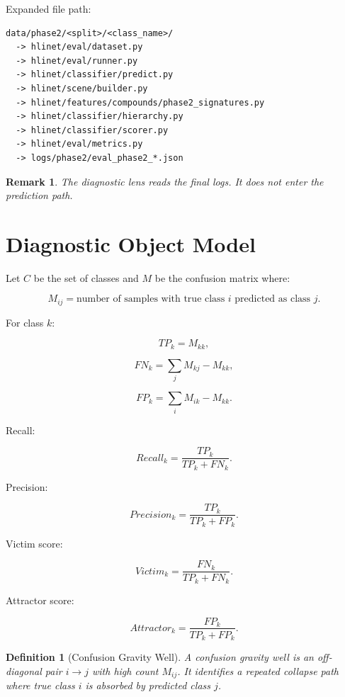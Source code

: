 \documentclass[12pt]{article}
\newtheorem{definition}{Definition}
\newtheorem{remark}{Remark}
\begin{document}
Expanded file path:

\begin{lstlisting}
data/phase2/<split>/<class_name>/
  -> hlinet/eval/dataset.py
  -> hlinet/eval/runner.py
  -> hlinet/classifier/predict.py
  -> hlinet/scene/builder.py
  -> hlinet/features/compounds/phase2_signatures.py
  -> hlinet/classifier/hierarchy.py
  -> hlinet/classifier/scorer.py
  -> hlinet/eval/metrics.py
  -> logs/phase2/eval_phase2_*.json
\end{lstlisting}

\begin{remark}
The diagnostic lens reads the final logs. It does not enter the prediction path.
\end{remark}

\section{Diagnostic Object Model}

Let \(C\) be the set of classes and \(M\) be the confusion matrix where:

\[
M_{ij}
=
\text{number of samples with true class } i
\text{ predicted as class } j.
\]

For class \(k\):

\[
TP_k = M_{kk},
\]

\[
FN_k = \sum_j M_{kj} - M_{kk},
\]

\[
FP_k = \sum_i M_{ik} - M_{kk}.
\]

Recall:

\[
Recall_k
=
\frac{TP_k}{TP_k + FN_k}.
\]

Precision:

\[
Precision_k
=
\frac{TP_k}{TP_k + FP_k}.
\]

Victim score:

\[
Victim_k
=
\frac{FN_k}{TP_k + FN_k}.
\]

Attractor score:

\[
Attractor_k
=
\frac{FP_k}{TP_k + FP_k}.
\]

\begin{definition}[Confusion Gravity Well]
A confusion gravity well is an off-diagonal pair \(i \rightarrow j\) with high
count \(M_{ij}\). It identifies a repeated collapse path where true class \(i\)
is absorbed by predicted class \(j\).
\end{definition}
\end{document}
